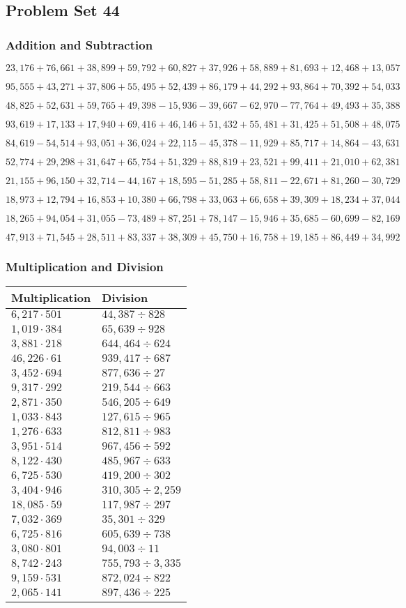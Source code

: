 \hypertarget{problem-set-44-3}{%
\subsection{Problem Set 44}\label{problem-set-44-3}}

\hypertarget{addition-and-subtraction-266}{%
\subsubsection{Addition and
Subtraction}\label{addition-and-subtraction-266}}

\(23,176+76,661+38,899+59,792+60,827+37,926+58,889+81,693+12,468+ 13,057\)

\(95,555+43,271+37,806+55,495+52,439+86,179+44,292+93,864+70,392+54,033\)

\(48,825+52,631+59,765+49,398-15,936-39,667-62,970-77,764+49,493+35,388\)

\(93,619+17,133+17,940+69,416+46,146+51,432+55,481+31,425+51,508+48,075\)

\(84,619-54,514+93,051+36,024+22,115-45,378-11,929+85,717+14,864-43,631\)

\(52,774+29,298+31,647+65,754+51,329+88,819+23,521+99,411+21,010+62,381\)

\(21,155+96,150+32,714-44,167+18,595-51,285+58,811-22,671+81,260-30,729\)

\(18,973+12,794+16,853+10,380+66,798+33,063+66,658+39,309+18,234+37,044\)

\(18,265+94,054+31,055-73,489+87,251+78,147-15,946+35,685-60,699-82,169\)

\(47,913+71,545+28,511+83,337+38,309+45,750+16,758+19,185+86,449+34,992\)

\hypertarget{multiplication-and-division-265}{%
\subsubsection{Multiplication and
Division}\label{multiplication-and-division-265}}

\begin{longtable}[]{@{}ll@{}}
\toprule
Multiplication & Division\tabularnewline
\midrule
\endhead
\(6,217\cdot501\) & \(44,387÷828\)\tabularnewline
\(1,019\cdot384\) & \(65,639÷928\)\tabularnewline
\(3,881\cdot218\) & \(644,464÷624\)\tabularnewline
\(46,226\cdot61\) & \(939,417÷687\)\tabularnewline
\(3,452\cdot694\) & \(877,636÷27\)\tabularnewline
\(9,317\cdot292\) & \(219,544÷663\)\tabularnewline
\(2,871\cdot350\) & \(546,205÷649\)\tabularnewline
\(1,033\cdot843\) & \(127,615÷965\)\tabularnewline
\(1,276\cdot633\) & \(812,811÷983\)\tabularnewline
\(3,951\cdot514\) & \(967,456÷592\)\tabularnewline
\(8,122\cdot430\) & \(485,967÷633\)\tabularnewline
\(6,725\cdot530\) & \(419,200÷302\)\tabularnewline
\(3,404\cdot946\) & \(310,305÷2,259\)\tabularnewline
\(18,085\cdot59\) & \(117,987÷297\)\tabularnewline
\(7,032\cdot369\) & \(35,301÷329\)\tabularnewline
\(6,725\cdot816\) & \(605,639÷738\)\tabularnewline
\(3,080\cdot801\) & \(94,003÷11\)\tabularnewline
\(8,742\cdot243\) & \(755,793÷3,335\)\tabularnewline
\(9,159\cdot531\) & \(872,024÷822\)\tabularnewline
\(2,065\cdot141\) & \(897,436÷225\)\tabularnewline
\bottomrule
\end{longtable}

